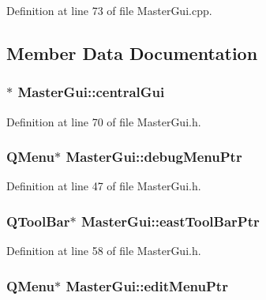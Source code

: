 Definition at line 73 of file Master\-Gui.\-cpp.



\subsection{Member Data Documentation}
\hypertarget{class_master_gui_a565fc5a3622b8b5417b26dd1306439b8}{
\subsubsection[{central\-Gui}]{$\ast$ Master\-Gui\-::central\-Gui\hspace{0.3cm}{\ttfamily [private]}}}\label{class_master_gui_a565fc5a3622b8b5417b26dd1306439b8}


Definition at line 70 of file Master\-Gui.\-h.

\hypertarget{class_master_gui_ac1efdb45cdde47584625a8026166c316}{
\subsubsection[{debug\-Menu\-Ptr}]{\setlength{\rightskip}{0pt plus 5cm}Q\-Menu$\ast$ Master\-Gui\-::debug\-Menu\-Ptr\hspace{0.3cm}{\ttfamily [private]}}}\label{class_master_gui_ac1efdb45cdde47584625a8026166c316}


Definition at line 47 of file Master\-Gui.\-h.

\hypertarget{class_master_gui_a289b4db70744b812566a689bf368c37c}{
\subsubsection[{east\-Tool\-Bar\-Ptr}]{\setlength{\rightskip}{0pt plus 5cm}Q\-Tool\-Bar$\ast$ Master\-Gui\-::east\-Tool\-Bar\-Ptr\hspace{0.3cm}{\ttfamily [private]}}}\label{class_master_gui_a289b4db70744b812566a689bf368c37c}


Definition at line 58 of file Master\-Gui.\-h.

\hypertarget{class_master_gui_aeb708f257518fb47d567d1130bfc7f7f}{
\subsubsection[{edit\-Menu\-Ptr}]{\setlength{\rightskip}{0pt plus 5cm}Q\-Menu$\ast$ Master\-Gui\-::edit\-Menu\-Ptr\hspace{0.3cm}{\ttfamily [private]}}}\label{class_master_gui_aeb708f257518fb47d567d1130bfc7f7f}


